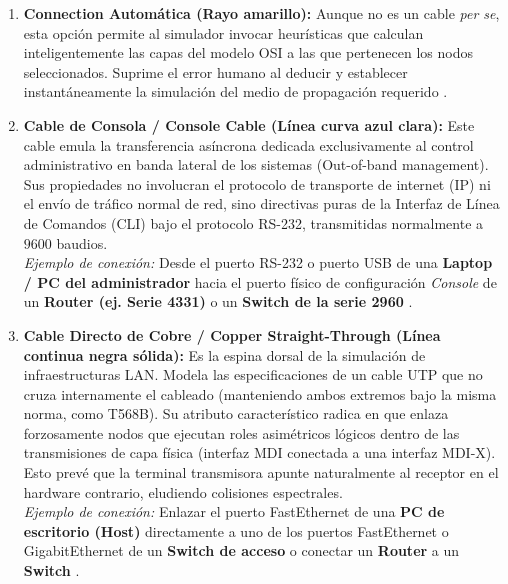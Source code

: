 \documentclass[a4paper,12pt]{article}
\begin{document}
\begin{enumerate}
    \item \textbf{Connection Automática (Rayo amarillo):}
    Aunque no es un cable \textit{per se}, esta opción permite al simulador invocar heurísticas que calculan inteligentemente las capas del modelo OSI a las que pertenecen los nodos seleccionados. Suprime el error humano al deducir y establecer instantáneamente la simulación del medio de propagación requerido \cite{packet_tracer_cables_guide}.
    
    \item \textbf{Cable de Consola / Console Cable (Línea curva azul clara):}
    Este cable emula la transferencia asíncrona dedicada exclusivamente al control administrativo en banda lateral de los sistemas (Out-of-band management). Sus propiedades no involucran el protocolo de transporte de internet (IP) ni el envío de tráfico normal de red, sino directivas puras de la Interfaz de Línea de Comandos (CLI) bajo el protocolo RS-232, transmitidas normalmente a $9600$ baudios. \\
    \textit{Ejemplo de conexión:} Desde el puerto RS-232 o puerto USB de una \textbf{Laptop / PC del administrador} hacia el puerto físico de configuración \textit{Console} de un \textbf{Router (ej. Serie 4331)} o un \textbf{Switch de la serie 2960} \cite{packet_tracer_cables_guide, cisco_packet_tracer_video}.
    
    \item \textbf{Cable Directo de Cobre / Copper Straight-Through (Línea continua negra sólida):}
    Es la espina dorsal de la simulación de infraestructuras LAN. Modela las especificaciones de un cable UTP que no cruza internamente el cableado (manteniendo ambos extremos bajo la misma norma, como T568B). Su atributo característico radica en que enlaza forzosamente nodos que ejecutan roles asimétricos lógicos dentro de las transmisiones de capa física (interfaz MDI conectada a una interfaz MDI-X). Esto prevé que la terminal transmisora apunte naturalmente al receptor en el hardware contrario, eludiendo colisiones espectrales. \\
    \textit{Ejemplo de conexión:} Enlazar el puerto FastEthernet de una \textbf{PC de escritorio (Host)} directamente a uno de los puertos FastEthernet o GigabitEthernet de un \textbf{Switch de acceso} o conectar un \textbf{Router} a un \textbf{Switch} \cite{packet_tracer_cables_guide, cisco_packet_tracer_video}.


\end{enumerate}
\end{document}
